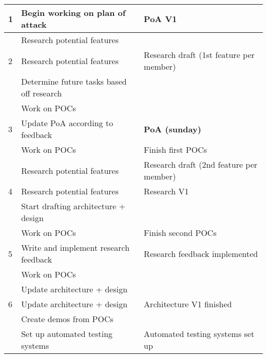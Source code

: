 \documentclass{article}
\begin{document}
\begin{longtable}{|l|p{}|p{}|}
    1                    & Begin working on plan of attack           & PoA V1                                  \\ \hline
                         & Research potential features               &                                         \\ \hline
    2                    & Research potential features               & Research draft (1st feature per member) \\ \hline
                         & Determine future tasks based off research &                                         \\ \hline
                         & Work on POCs                              &                                         \\ \hline
    3                    & Update PoA according to feedback          & \textbf{PoA (sunday)}                   \\ \hline
                         & Work on POCs                              & Finish first POCs                       \\ \hline
                         & Research potential features               & Research draft (2nd feature per member) \\ \hline
    4                    & Research potential features               & Research V1                             \\ \hline
                         & Start drafting architecture + design      &                                         \\ \hline
                         & Work on POCs                              & Finish second POCs                      \\ \hline
    5                    & Write and implement research feedback     & Research feedback implemented           \\ \hline
                         & Work on POCs                              &                                         \\ \hline
                         & Update architecture + design              &                                         \\ \hline
    6                    & Update architecture + design              & Architecture V1 finished                \\ \hline
                         & Create demos from POCs                    &                                         \\ \hline
                         & Set up automated testing systems          & Automated testing systems set up        \\ \hline

\end{longtable}
\end{document}
